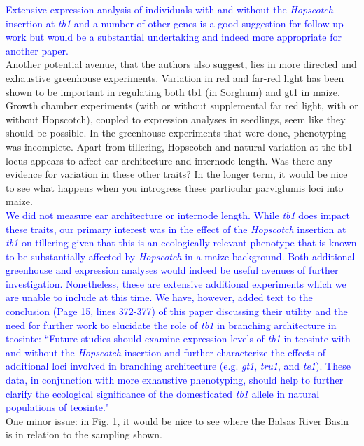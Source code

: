 \documentclass[11pt]{article}
\newcommand{\res}[1]{\noindent \textcolor{blue}{{#1}} \\}
\begin{document}
\res{Extensive expression analysis of individuals with and without the \emph{Hopscotch} insertion at \emph{tb1} and a number of other genes is a good suggestion for follow-up work but would be a substantial undertaking and indeed more appropriate for another paper. }

Another potential avenue, that the authors also suggest, lies in more directed and exhaustive greenhouse experiments. Variation in red and far-red light has been shown to be important in regulating both tb1 (in Sorghum) and gt1 in maize. Growth chamber experiments (with or without supplemental far red light, with or without Hopscotch), coupled to expression analyses in seedlings, seem like they should be possible.  In the greenhouse experiments that were done, phenotyping was incomplete. Apart from tillering, Hopscotch and natural variation at the tb1 locus appears to affect ear architecture and internode length. Was there any evidence for variation in these other traits? In the longer term, it would be nice to see what happens when you introgress these particular parviglumis loci into maize.\\ 

\res{We did not measure ear architecture or internode length. 
While \emph{tb1} does impact these traits, our primary interest was in the effect of the \emph{Hopscotch} insertion at \emph{tb1} on tillering given that this is an ecologically relevant phenotype that is known to be substantially affected by \emph{Hopscotch} in a maize background.
Both additional greenhouse and expression analyses would indeed be useful avenues of further investigation.
Nonetheless, these are extensive additional experiments which we are unable to include at this time. 
We have, however, added text to the conclusion (Page 15, lines 372-377) of this paper discussing their utility and the need for further work to elucidate the role of \emph{tb1} in branching architecture in teosinte:
``Future studies should examine expression levels of \emph{tb1} in teosinte with and without the \emph{Hopscotch} insertion and further characterize the effects of additional loci involved in branching architecture (e.g. \emph{gt1}, \emph{tru1}, and \emph{te1}).  These data, in conjunction with more exhaustive phenotyping, should help to further clarify the ecological significance of the domesticated \emph{tb1} allele in natural populations of teosinte."}

One minor issue: in Fig. 1, it would be nice to see where the Balsas River Basin is in relation to the sampling shown.\\ 
\end{document}
